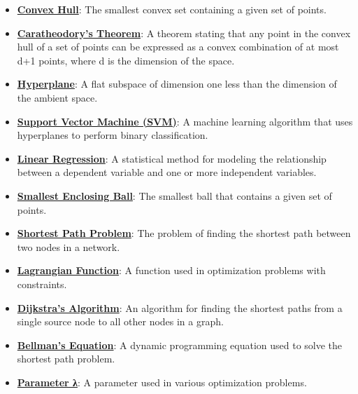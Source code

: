 \documentclass{article}%
\begin{document}
\begin{itemize}[leftmargin=*]
\item \href{https://www.math.purdue.edu/~yipn/421/2024-11-21-EconNetSimplex.pdf#page=4}{\textbf{Convex Hull}}: The smallest convex set containing a given set of points. %
\item \href{https://www.math.purdue.edu/~yipn/421/2024-11-21-EconNetSimplex.pdf#page=4}{\textbf{Caratheodory's Theorem}}: A theorem stating that any point in the convex hull of a set of points can be expressed as a convex combination of at most d+1 points, where d is the dimension of the space. %
\item \href{https://www.math.purdue.edu/~yipn/421/2024-11-21-EconNetSimplex.pdf#page=4}{\textbf{Hyperplane}}: A flat subspace of dimension one less than the dimension of the ambient space. %
\item \href{https://www.math.purdue.edu/~yipn/421/2024-11-21-EconNetSimplex.pdf#page=4}{\textbf{Support Vector Machine (SVM)}}: A machine learning algorithm that uses hyperplanes to perform binary classification. %
\item \href{https://www.math.purdue.edu/~yipn/421/2024-11-21-EconNetSimplex.pdf#page=4}{\textbf{Linear Regression}}: A statistical method for modeling the relationship between a dependent variable and one or more independent variables. %
\item \href{https://www.math.purdue.edu/~yipn/421/2024-11-21-EconNetSimplex.pdf#page=4}{\textbf{Smallest Enclosing Ball}}: The smallest ball that contains a given set of points. %
\item \href{https://www.math.purdue.edu/~yipn/421/2024-11-21-EconNetSimplex.pdf#page=4}{\textbf{Shortest Path Problem}}: The problem of finding the shortest path between two nodes in a network. %
\item \href{https://www.math.purdue.edu/~yipn/421/2024-11-21-EconNetSimplex.pdf#page=4}{\textbf{Lagrangian Function}}: A function used in optimization problems with constraints. %
\item \href{https://www.math.purdue.edu/~yipn/421/2024-11-21-EconNetSimplex.pdf#page=4}{\textbf{Dijkstra's Algorithm}}: An algorithm for finding the shortest paths from a single source node to all other nodes in a graph. %
\item \href{https://www.math.purdue.edu/~yipn/421/2024-11-21-EconNetSimplex.pdf#page=4}{\textbf{Bellman's Equation}}: A dynamic programming equation used to solve the shortest path problem. %
\item \href{https://www.math.purdue.edu/~yipn/421/2024-11-21-EconNetSimplex.pdf#page=4}{\textbf{Parameter λ}}: A parameter used in various optimization problems. %

\end{itemize}
\end{document}
